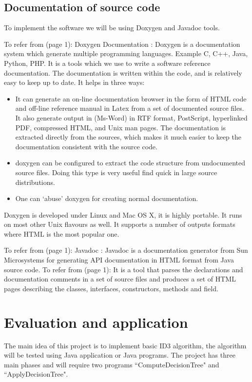 \documentclass{report}
\begin{document}
\subsection{Documentation of source code}
\label{sec:documentsource}

To implement the software we will be using Doxygen and Javadoc tools. 

To refer from \cite{Doxygen}(page 1): Doxygen Documentation : Doxygen is a documentation system which generate multiple programming languages. Example C, C++, Java, Python, PHP. It is a tools which we use to write a software reference documentation. The documentation is written within the code, and is relatively easy to keep up to date.
It helps in three ways: 
\begin{itemize}
\item It can generate an on-line documentation browser in the form of HTML code and off-line reference manual in Latex from a set of documented source files. It also generate output in (Ms-Word) in RTF format, PostScript, hyperlinked PDF, compressed HTML, and Unix man pages. The documentation is extracted directly from the sources, which makes it much easier to keep the documentation consistent with the source code.
\item doxygen can be configured to extract the code structure from undocumented source files. Doing this type is very useful find quick in large source distributions.
\item One can `abuse' doxygen for creating normal documentation.
\end{itemize}
Doxygen is developed under Linux and Mac OS X, it is highly portable. It runs on most other Unix flavours as well. It supports a number of outputs formats where HTML is the most popular one. 

To refer from \cite{Wikipedia_Javadoc}(page 1):  Javadoc : Javadoc is a documentation generator from Sun Microsystems  for generating API documentation in HTML format from Java source code. To refer from \cite{Javadoc}(page 1):  It is a tool that parses the declarations and documentation comments in a set of source files and produces a set of HTML pages describing the classes, interfaces, constructors, methods and field. 

\section{Evaluation and application}
\label{sec:eval}

The main idea of this project is to implement basic ID3 algorithm, the algorithm will be tested using Java application or Java programs. The project has three main phases and will require two programs ``ComputeDecisionTree" and ``ApplyDecisionTree". 
\end{document}
